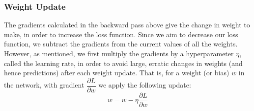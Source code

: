 \documentclass[11pt]{article} %
\theoremstyle{plain}
\theoremstyle{definition}
\begin{document}
\subsubsection{Weight Update}
The gradients calculated in the backward pass above give the change in weight to make, in order to increase the loss function. Since we aim to decrease our loss function, we subtract the gradients from the current values of all the weights. However, as mentioned, we first multiply the gradients by a hyperparameter \(\eta\), called the learning rate, in order to avoid large, erratic changes in weights (and hence predictions) after each weight update. That is, for a weight (or bias) \(w\) in the network, with gradient \(\dfrac{\partial L}{\partial w}\) we apply the following update:
\[ w = w - \eta \dfrac{\partial L}{\partial w} \]
\end{document}
